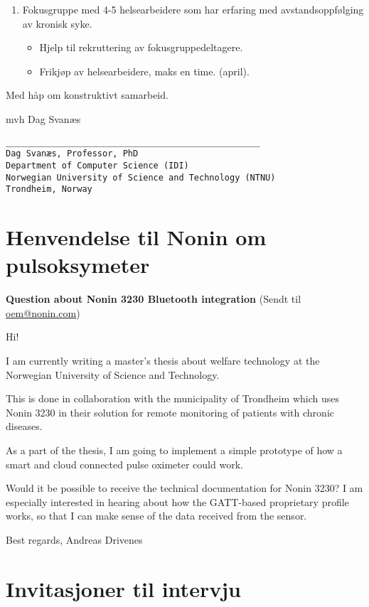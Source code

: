 \begin{enumerate}
\def\labelenumi{\arabic{enumi}.}
\setcounter{enumi}{1}
\tightlist
\item
  Fokusgruppe med 4-5 helsearbeidere som har erfaring med
  avstandsoppfølging av kronisk syke.

  \begin{itemize}
  \tightlist
  \item
    Hjelp til rekruttering av fokusgruppedeltagere.
  \item
    Frikjøp av helsearbeidere, maks en time. (april).
  \end{itemize}
\end{enumerate}

Med håp om konstruktivt samarbeid.

mvh
Dag Svanæs

\begin{verbatim}
__________________________________________________
Dag Svanæs, Professor, PhD
Department of Computer Science (IDI)
Norwegian University of Science and Technology (NTNU)
Trondheim, Norway
\end{verbatim}

\chapter{Henvendelse til Nonin om pulsoksymeter}
\label{appendix:pulsoksymeter}
\textbf{Question about Nonin 3230 Bluetooth integration}
(Sendt til \url{oem@nonin.com})

Hi!

I am currently writing a master's thesis about welfare technology at the Norwegian University of Science and Technology. 

This is done in collaboration with the municipality of Trondheim which uses Nonin 3230 in their
solution for remote monitoring of patients with chronic diseases. 

As a part of the thesis, I am going to implement a simple prototype of how a smart and cloud connected pulse oximeter could work.

Would it be possible to receive the technical documentation for Nonin 3230?
I am especially interested in hearing about how the GATT-based proprietary profile works, so
that I can make sense of the data received from the sensor. 

Best regards,\newline
Andreas Drivenes\newline

\chapter{Invitasjoner til intervju}
\label{appendix:invitasjon_evaluering}

